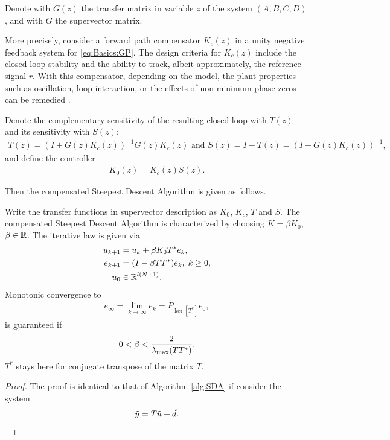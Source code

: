 Denote with $G(z)$ the transfer matrix in variable $z$ of the system $(A,B,C,D)$, and with $G$ the supervector matrix. 

More precisely, consider a forward path compensator $K_c(z)$ in a unity negative feedback system for \eqref{eq:Basics:GP}. 
The design criteria for $K_c(z)$ include the closed-loop stability and the ability to track, albeit approximately, the reference signal $r$. With this compensator, depending on the model, the plant properties such as oscillation, loop interaction, or the effects of non-minimum-phase zeros can be remedied . 

Denote the complementary sensitivity of the resulting closed loop with $T(z)$ and its sensitivity with $S(z)$:
\begin{align}
T(z) = (I + G(z) K_c(z))^{-1}G(z) K_c(z) \text{ and } S(z)  = I - T(z) =  (I + G(z) K_c(z))^{-1}, 
\end{align}
and define the controller
\begin{align}
K_0(z) = K_c(z) S(z). 
\end{align}

Then the compensated Steepest Descent Algorithm is given as follows. 

\begin{alg}
	\label{alg: FBDesign}
	Write the transfer functions in supervector description as 
	$K_0$, $K_c$, $T$ and $S$. The compensated Steepest Descent Algorithm is characterized by choosing  $K = \beta K_0$, $\beta \in {\mathbb{R}}$. 
	The iterative law is given via 
	\begin{align}
	\label{eq:errFBDesign}
	\begin{split}
	u_{k+1} &= u_k + \beta K_0 T^* e_k, \\
	e_{k+1} &= (I- \beta T T^*) e_{k}, \; k\geq 0,\\
	u_0& \in {\mathbb{R}}^{l (N+1)}. 
	\end{split}	
	\end{align}
	Monotonic convergence to 
	\begin{align}
	\label{eq:FDErrLim} 
	e_\infty  = \lim_{k\to\infty} e_k = P_{\ker[T^*]}e_0,
	\end{align} 
	is guaranteed if
	\begin{align*}
	0 <\beta < \frac{2}{\lambda_{\mathrm{max}}(T T^*)}.
\end{align*}
$T^*$ stays here for conjugate transpose of the matrix $T$. 
\end{alg}
\begin{proof}
	The proof is identical to that  of Algorithm \ref{alg:SDA} if consider the system
	\begin{align}
	\tilde{y} = T\tilde{u} + \tilde{d}.
	\end{align}
\end{proof}

